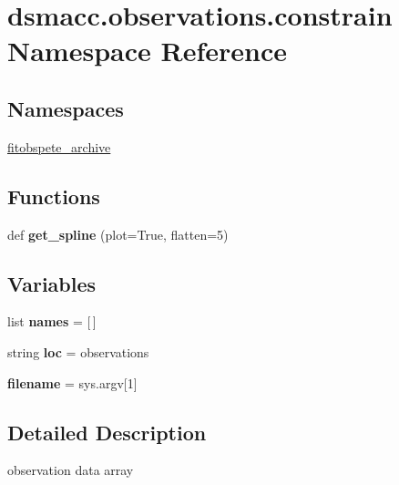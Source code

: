 \hypertarget{namespacedsmacc_1_1observations_1_1constrain}{}\section{dsmacc.\+observations.\+constrain Namespace Reference}
\label{namespacedsmacc_1_1observations_1_1constrain}
\subsection*{Namespaces}
\begin{DoxyCompactItemize}
\item 
 \mbox{\hyperlink{namespacedsmacc_1_1observations_1_1constrain_1_1fitobspete__archive}{fitobspete\+\_\+archive}}
\end{DoxyCompactItemize}
\subsection*{Functions}
\begin{DoxyCompactItemize}
\item 
\mbox{\label{namespacedsmacc_1_1observations_1_1constrain_abdd680439aa7580b888dd2fa87e5c6f3}} 
def {\bfseries get\+\_\+spline} (plot=True, flatten=5)
\end{DoxyCompactItemize}
\subsection*{Variables}
\begin{DoxyCompactItemize}
\item 
\mbox{\label{namespacedsmacc_1_1observations_1_1constrain_a1bcac6f5ffe4d990dd8ea43cccaa5d52}} 
list {\bfseries names} = \mbox{[}$\,$\mbox{]}
\item 
\mbox{\label{namespacedsmacc_1_1observations_1_1constrain_a1d6d363f4597693e5f210e1d8a852c95}} 
string {\bfseries loc} = \textquotesingle{}observations\textquotesingle{}
\item 
\mbox{\label{namespacedsmacc_1_1observations_1_1constrain_a06341d92dd764e98b221436ab50b1154}} 
{\bfseries filename} = sys.\+argv\mbox{[}1\mbox{]}
\end{DoxyCompactItemize}


\subsection{Detailed Description}
\begin{DoxyVerb}observation data array \end{DoxyVerb}
 